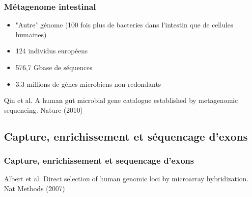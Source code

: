 \documentclass{beamer}
\begin{document}
\begin{frame}
	\frametitle{Métagenome intestinal}
\begin{itemize}
	\item "Autre" génome (100 fois plus de bacteries dans l'intestin que de cellules humaines)
	\item 124 individus européens
	\item 576,7 Gbase de séquences
	\item  3.3 millions de gènes microbiens non-redondants
\end{itemize}
\tiny{Qin et al. A human gut microbial gene catalogue established by metagenomic sequencing. Nature (2010)}
\end{frame}



\subsection{Capture, enrichissement et séquencage d'exons} %
\label{sub:subsection_name}



\begin{frame}
	\frametitle{Capture, enrichissement et sequencage d'exons}
		\tiny{Albert et al. Direct selection of human genomic loci by microarray hybridization. Nat Methods (2007)}
\end{frame}
\end{document}
